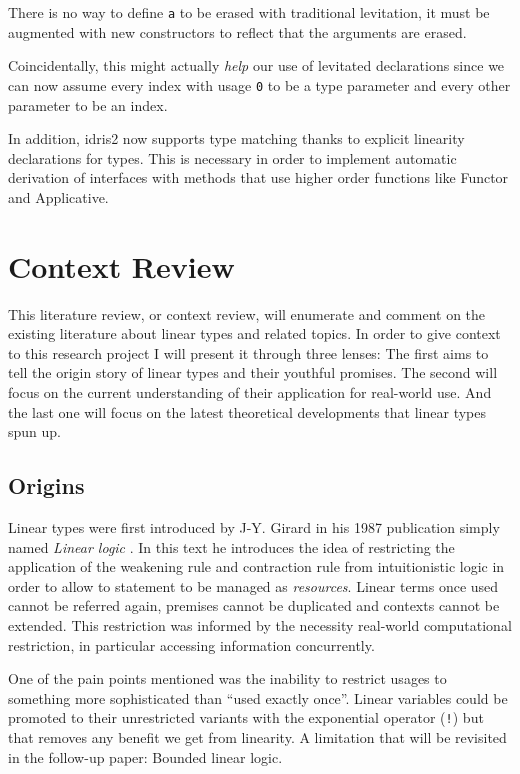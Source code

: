 \documentclass[
]{article}
\begin{document}
There is no way to define \texttt{a} to be erased with traditional
levitation, it must be augmented with new constructors to reflect that
the arguments are erased.

Coincidentally, this might actually \emph{help} our use of levitated
declarations since we can now assume every index with usage \texttt{0}
to be a type parameter and every other parameter to be an index.

In addition, idris2 now supports type matching thanks to explicit
linearity declarations for types. This is necessary in order to
implement automatic derivation of interfaces with methods that use
higher order functions like Functor and Applicative.

\hypertarget{context-review}{%
\section{Context Review}\label{context-review}}

This literature review, or context review, will enumerate and comment on
the existing literature about linear types and related topics. In order
to give context to this research project I will present it through three
lenses: The first aims to tell the origin story of linear types and
their youthful promises. The second will focus on the current
understanding of their application for real-world use. And the last one
will focus on the latest theoretical developments that linear types spun
up.

\hypertarget{origins}{%
\subsection{Origins}\label{origins}}

Linear types were first introduced by J-Y. Girard in his 1987
publication simply named \emph{Linear logic} . In this text he
introduces the idea of restricting the application of the weakening rule
and contraction rule from intuitionistic logic in order to allow to
statement to be managed as \emph{resources}. Linear terms once used
cannot be referred again, premises cannot be duplicated and contexts
cannot be extended. This restriction was informed by the necessity
real-world computational restriction, in particular accessing
information concurrently.

One of the pain points mentioned was the inability to restrict usages to
something more sophisticated than ``used exactly once''. Linear
variables could be promoted to their unrestricted variants with the
exponential operator (\texttt{!}) but that removes any benefit we get
from linearity. A limitation that will be revisited in the follow-up
paper: Bounded linear logic.
\end{document}
